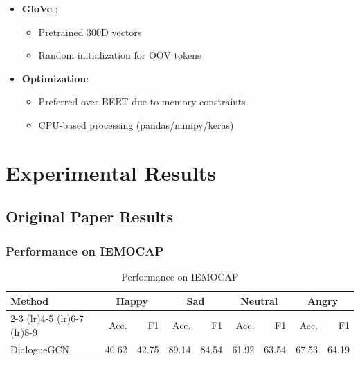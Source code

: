 \documentclass[a4paper,11pt]{article}
\begin{document}
\begin{itemize}
  \item \textbf{GloVe} \cite{pennington2014glove}:
    \begin{itemize}
      \item Pretrained 300D vectors
      \item Random initialization for OOV tokens
    \end{itemize}
  \item \textbf{Optimization}:
    \begin{itemize}
      \item Preferred over BERT due to memory constraints
      \item CPU-based processing (pandas/numpy/keras)
    \end{itemize}
\end{itemize}

\newpage
\section{Experimental Results}

\subsection{Original Paper Results}

\subsubsection{Performance on IEMOCAP}
\begin{table}[htbp]
  \centering
  \begin{tabular}{lrrrrrrrr}
    \toprule
    Method & \multicolumn{2}{c}{Happy} & \multicolumn{2}{c}{Sad} & \multicolumn{2}{c}{Neutral} & \multicolumn{2}{c}{Angry} \\
    \cmidrule(lr){2-3} \cmidrule(lr){4-5} \cmidrule(lr){6-7} \cmidrule(lr){8-9}
    & Acc. & F1 & Acc. & F1 & Acc. & F1 & Acc. & F1 \\
    \midrule
    DialogueGCN & 40.62 & 42.75 & 89.14 & 84.54 & 61.92 & 63.54 & 67.53 & 64.19 \\
    \bottomrule
  \end{tabular}
  \caption{Performance on IEMOCAP \cite{ghosal2019dialoguegcn}}
  \label{tab:orig_iemocap}
\end{table}
\end{document}
